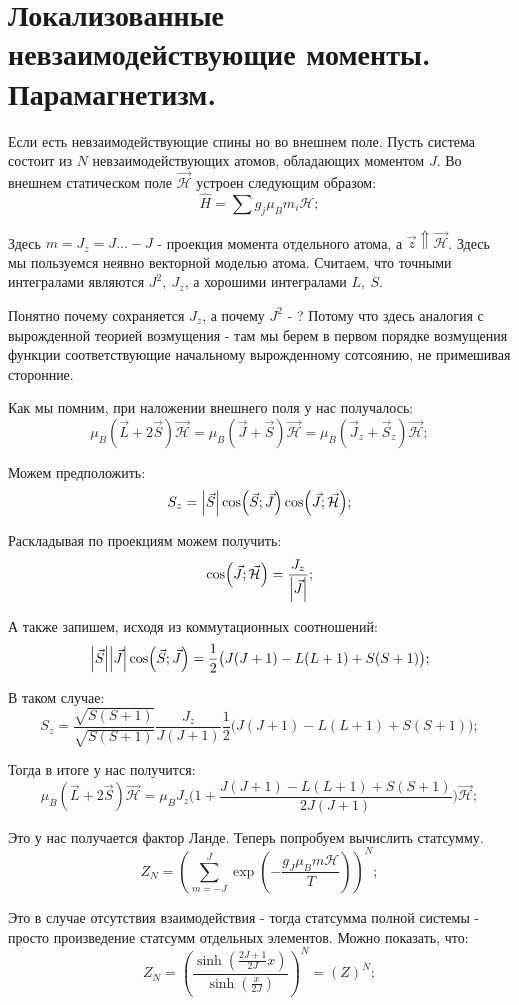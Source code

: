 \documentclass[a4paper, 14pt, russian]{article}
\newcommand{\be}{\begin{equation}}
\newcommand{\ee}{\end{equation}}
\begin{document}
	\section{Локализованные невзаимодействующие моменты. Парамагнетизм.}

	Если есть невзаимодействующие спины но во внешнем поле. Пусть система 
	состоит из $N$ невзаимодействующих атомов, обладающих моментом $J$.
	Во внешнем статическом поле $\vec{\mathcal H}$ устроен следующим образом:
	\be
		\label{eq86}
		\hat H = \sum g_j \mu_B m_i \mathcal H;
	\ee

	Здесь $m = J_z = J \hdots - J$ - проекция момента отдельного атома, а 
	$\vec z \Uparrow \vec{\mathcal H}$. Здесь мы пользуемся неявно векторной
	моделью атома. Считаем, что точными интегралами являются $J^2,~J_z$,
	а хорошими интегралами $L,~S$.

	Понятно почему сохраняется $J_z$, а почему $J^2$ - ? Потому что здесь
	аналогия с вырожденной теорией возмущения - там мы берем в первом порядке 
	возмущения функции соответствующие начальному вырожденному сотсоянию, не
	примешивая сторонние.

	Как мы помним, при наложении внешнего поля у нас получалось:
	\be
		\mu_B (\vec L + 2 \vec S) \vec{\mathcal H} = \mu_B (\vec J + \vec S) \vec{\mathcal H} =
			\mu_B ({\vec J}_z + {\vec S}_z)\vec{\mathcal H};
	\ee

	Можем предположить:
	\be
		S_z = \abs{\vec S} \cos(\vec S ; \vec J)\cos(\vec J;\vec{\mathcal H});
	\ee

	Раскладывая по проекциям можем получить:
	\be
		\cos(\vec J; \vec{\mathcal H}) = \frac{J_z}{\abs{\vec J}};
	\ee

	А также запишем, исходя из коммутационных соотношений:
	\be
		\abs{\vec S}\abs{\vec J} \cos(\vec S; \vec J) = \frac{1}{2} 
			\big(J(J + 1) - L(L+1) + S(S+1)\big);
	\ee

	В таком случае:
	\be
		S_z = \frac{\sqrt{S(S+1)}}{\sqrt{S(S+1)}} \frac{J_z}{J(J+1)} 
			\frac{1}{2} \big(J(J + 1) - L(L+1) + S(S+1)\big);
	\ee

	Тогда в итоге у нас получится:
	\be
		\mu_B(\vec L  + 2 \vec S)\vec{\mathcal H} = \mu_B J_z \big(
			1+ \frac{J(J + 1) - L(L+1) + S(S+1)}{2J(J+1)}\big) \vec{\mathcal H};
	\ee

	Это у нас получается фактор Ланде. Теперь попробуем вычислить статсумму.
	\be
		\label{eq87}
		Z_N = \left(\sum_{m = - J}^J \exp(-\frac{g_J \mu_B m \mathcal H}{T})\right)^N;
	\ee

	Это в случае отсутствия взаимодействия - тогда статсумма полной системы - просто
	произведение статсумм отдельных элементов. Можно показать, что:
	\be
		Z_N = \left(\frac{\sinh(\frac{2J + 1}{2J} x)}{\sinh(\frac{x}{2J})}\right)^N = (Z)^N;
	\ee
\end{document}
